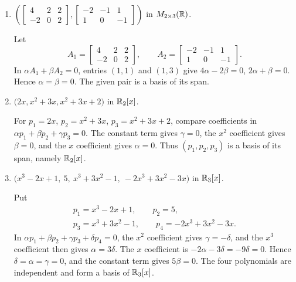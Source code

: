 \begin{enumerate}[label=\alph*)]
\item $\left(\begin{bmatrix}4&2&2\\-2&0&2\end{bmatrix},\begin{bmatrix}-2&-1&1\\1&0&-1\end{bmatrix}\right)$ in $M_{2\times3}(\mathbb R)$.

\begin{answer}
Let
\[
 A_1=\begin{bmatrix}4&2&2\\-2&0&2\end{bmatrix},\qquad
 A_2=\begin{bmatrix}-2&-1&1\\1&0&-1\end{bmatrix}.
\]
In $\alpha A_1+\beta A_2=0$, entries $(1,1)$ and $(1,3)$ give
$4\alpha-2\beta=0$, $2\alpha+\beta=0$.
Hence $\alpha=\beta=0$. The given pair is a basis of its span.
\end{answer}

\item $\bigl(2x,x^2+3x,x^2+3x+2\bigr)$ in $\mathbb R_2[x]$.

\begin{answer}
For $p_1=2x$, $p_2=x^2+3x$, $p_3=x^2+3x+2$, compare coefficients
in $\alpha p_1+\beta p_2+\gamma p_3=0$.
The constant term gives $\gamma=0$, the $x^2$ coefficient gives $\beta=0$,
and the $x$ coefficient gives $\alpha=0$.
Thus $(p_1,p_2,p_3)$ is a basis of its span, namely $\mathbb R_2[x]$.
\end{answer}

\item $\bigl(x^3-2x+1,\ 5,\ x^3+3x^2-1,\ -2x^3+3x^2-3x\bigr)$ in $\mathbb R_3[x]$.

\begin{answer}
Put
\[
\begin{gathered}
 p_1=x^3-2x+1,\qquad p_2=5,\\
 p_3=x^3+3x^2-1,\qquad p_4=-2x^3+3x^2-3x.
\end{gathered}
\]
In $\alpha p_1+\beta p_2+\gamma p_3+\delta p_4=0$, the $x^2$ coefficient
gives $\gamma=-\delta$, and the $x^3$ coefficient then gives $\alpha=3\delta$.
The $x$ coefficient is $-2\alpha-3\delta=-9\delta=0$.
Hence $\delta=\alpha=\gamma=0$, and the constant term gives $5\beta=0$.
The four polynomials are independent and form a basis of $\mathbb R_3[x]$.
\end{answer}
\end{enumerate}
